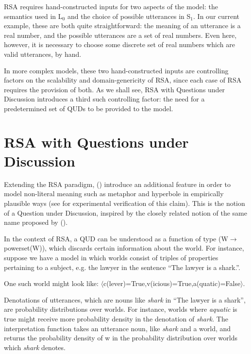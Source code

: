 \documentclass[10pt,letterpaper,twocolumn]{article}
\begin{document}
RSA requires hand-constructed inputs for two aspects of the model: the semantics used in L$_0$ and the choice of possible utterances in S$_1$. In our current example, these are both quite straightforward: the meaning of an utterance is a real number, and the possible utterances are a set of real numbers. Even here, however, it is necessary to choose some discrete set of real numbers which are valid utterances, by hand.

In more complex models, these two hand-constructed inputs are controlling factors on the scalability and domain-genericity of RSA, since each case of RSA requires the provision of both. As we shall see, RSA with Questions under Discussion introduces a third such controlling factor: the need for a predetermined set of QUDs to be provided to the model.


\section{RSA with Questions under Discussion} \label{rsawithqud}





Extending the RSA paradigm, (\cite{kao}) introduce an additional feature in order to model non-literal meaning such as metaphor and hyperbole in empirically plausible ways (see \cite{kao} for experimental verification of this claim). This is the notion of a Question under Discussion, inspired by the closely related notion of the same name proposed by (\cite{roberts1996information}).

In the context of RSA, a QUD can be understood as a function of type (W$\to$powerset(W)), which discards certain information about the world. For instance, suppose we have a model in which worlds consist of triples of properties pertaining to a subject, e.g. the lawyer in the sentence ``The lawyer is a shark.''. 

One such world might look like: $\langle$c(lever)=True,v(icious)=True,a(quatic)=False$\rangle$. 

Denotations of utterances, which are nouns like \emph{shark} in ``The lawyer is a shark'', are probability distributions over worlds. For instance, worlds where \emph{aquatic} is true might receive more probability density in the denotation of \emph{shark}. The interpretation function takes an utterance noun, like \emph{shark} and a world, and returns the probability density of w in the probability distribution over worlds which \emph{shark} denotes. 
\end{document}
